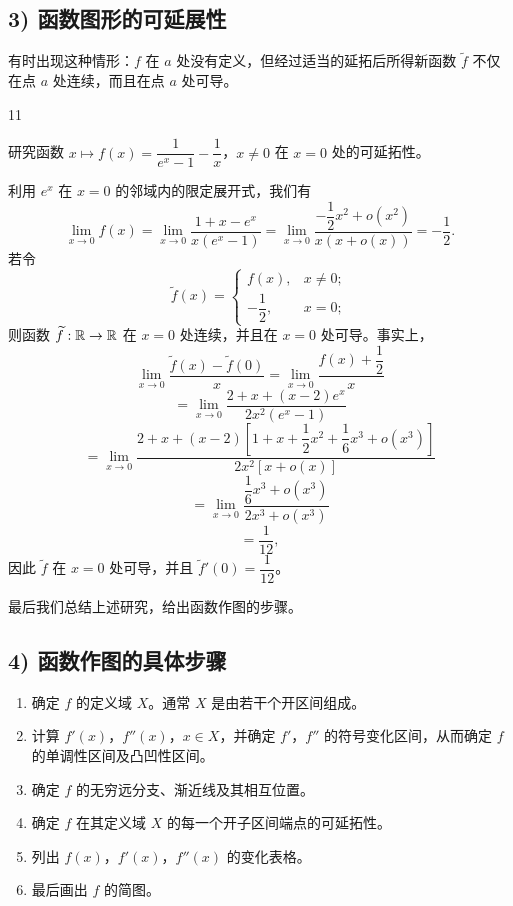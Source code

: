 \subsection*{3) 函数图形的可延展性}

有时出现这种情形：$f$ 在 $a$ 处没有定义，但经过适当的延拓后所得新函数 $\widetilde{f}$ 不仅在点 $a$ 处连续，而且在点 $a$ 处可导。

\begin{sourceexample}{11}

研究函数 $x\longmapsto f(x)=\dfrac{1}{e^x-1}-\dfrac{1}{x}$，$x\neq0$ 在 $x=0$ 处的可延拓性。

利用 $e^x$ 在 $x=0$ 的邻域内的限定展开式，我们有
\[\lim_{x\to0}f(x)=\lim_{x\to0}\frac{1+x-e^x}{x(e^x-1)}=\lim_{x\to0}\frac{-\dfrac{1}{2}x^2+o(x^2)}{x(x+o(x))}=-\frac{1}{2}.\]
若令
\[\widetilde{f}(x)=\begin{cases} f(x), & x\neq0;\\[1ex] -\dfrac{1}{2}, & x=0; \end{cases}\]
则函数 $\widetilde{f}:\mathbb{R}\to\mathbb{R}$ 在 $x=0$ 处连续，并且在 $x=0$ 处可导。事实上，
\[\lim_{x\to0}\frac{\widetilde{f}(x)-\widetilde{f}(0)}{x}=\lim_{x\to0}\frac{f(x)+\dfrac{1}{2}}{x}\]
\[=\lim_{x\to0}\frac{2+x+(x-2)e^{x}}{2x^{2}(e^{x}-1)}\]
\[=\lim_{x\to0}\frac{2+x+(x-2)\left[1+x+\dfrac{1}{2}x^{2}+\dfrac{1}{6}x^{3}+o(x^{3})\right]}{2x^{2}[x+o(x)]}\]
\[=\lim_{x\to0}\frac{\dfrac{1}{6}x^{3}+o(x^{3})}{2x^{3}+o(x^{3})}\]
\[=\frac{1}{12},\]
因此 $\widetilde{f}$ 在 $x=0$ 处可导，并且 $\widetilde{f}'(0)=\dfrac{1}{12}$。

\end{sourceexample}

最后我们总结上述研究，给出函数作图的步骤。

\subsection*{4) 函数作图的具体步骤}

\begin{enumerate}[label=\arabic{enumi})]
\item 确定 $f$ 的定义域 $X$。通常 $X$ 是由若干个开区间组成。
\item 计算 $f'(x)$，$f''(x)$，$x\in X$，并确定 $f'$，$f''$ 的符号变化区间，从而确定 $f$ 的单调性区间及凸凹性区间。
\item 确定 $f$ 的无穷远分支、渐近线及其相互位置。
\item 确定 $f$ 在其定义域 $X$ 的每一个开子区间端点的可延拓性。
\item 列出 $f(x)$，$f'(x)$，$f''(x)$ 的变化表格。
\item 最后画出 $f$ 的简图。
\end{enumerate}

